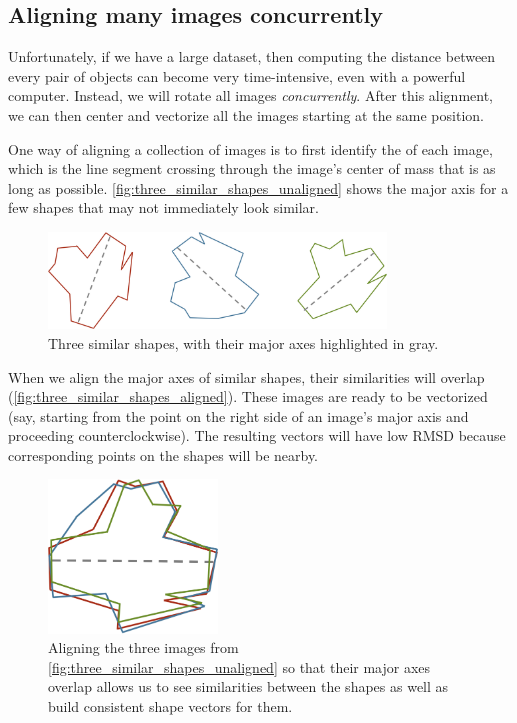 \FloatBarrier
{}
\subsection{Aligning many images concurrently}

Unfortunately, if we have a large dataset, then computing the distance between every pair of objects can become very time-intensive, even with a powerful computer. Instead, we will rotate all images \textit{concurrently}. After this alignment, we can then center and vectorize all the images starting at the same position.

One way of aligning a collection of images is to first identify the  of each image, which is the line segment crossing through the image's center of mass that is as long as possible. \autoref{fig:three_similar_shapes_unaligned} shows the major axis for a few shapes that may not immediately look similar.

\begin{figure}[h]
\centering
\mySfFamily
\includegraphics[width = 0.8\textwidth]{../images/three_similar_shapes_unaligned.png}
\caption{Three similar shapes, with their major axes highlighted in gray.}
\label{fig:three_similar_shapes_unaligned}
\end{figure}

When we align the major axes of similar shapes, their similarities will overlap (\autoref{fig:three_similar_shapes_aligned}). These images are ready to be vectorized (say, starting from the point on the right side of an image's major axis and proceeding counterclockwise). The resulting vectors will have low RMSD because corresponding points on the shapes will be nearby.

\begin{figure}[h]
\centering
\mySfFamily
\includegraphics[width = 0.4\textwidth]{../images/three_similar_shapes_aligned.png}
\caption{Aligning the three images from \autoref{fig:three_similar_shapes_unaligned} so that their major axes overlap allows us to see similarities between the shapes as well as build consistent shape vectors for them.}
\label{fig:three_similar_shapes_aligned}
\end{figure}

